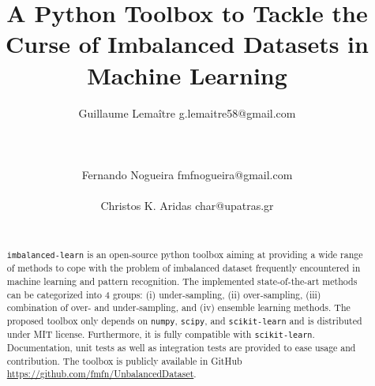 \documentclass[twoside,11pt]{article}
\begin{document}
\title{A Python Toolbox to Tackle the Curse of Imbalanced Datasets in Machine Learning}
\author{Guillaume Lema\^itre \email g.lemaitre58@gmail.com \\ 
     \\ 
     \\ 
     \\ 
        \AND
        Fernando Nogueira \email fmfnogueira@gmail.com \\ 
         \\ 
        \AND
        Christos K. Aridas \email char@upatras.gr \\ 
         \\ 
        } 
\editor{-}

\maketitle

\begin{abstract}%
\texttt{imbalanced-learn} is an open-source python toolbox aiming at providing a wide range of methods to cope with the problem of imbalanced dataset frequently encountered in machine learning and pattern recognition.
The implemented state-of-the-art methods can be categorized into 4 groups: (i) under-sampling, (ii) over-sampling, (iii) combination of over- and under-sampling, and (iv) ensemble learning methods.
The proposed toolbox only depends on \texttt{numpy}, \texttt{scipy}, and \texttt{scikit-learn} and is distributed under MIT license.
Furthermore, it is fully compatible with \texttt{scikit-learn}.%
Documentation, unit tests as well as integration tests are provided to ease usage and contribution.
The toolbox is publicly available in GitHub \url{https://github.com/fmfn/UnbalancedDataset}.
\end{abstract}
\end{document}
